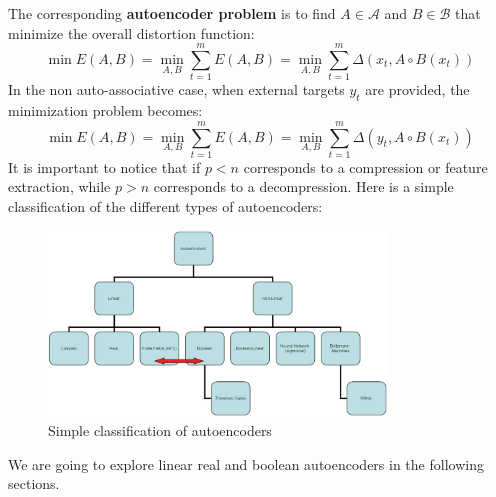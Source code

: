 \documentclass{article}
\begin{document}
 The corresponding \textbf{autoencoder problem} is to find $A \in \mathcal{A}$ and $B \in \mathcal{B}$ that minimize the overall distortion function:
\begin{equation}
    \min E(A,B) = \min_{A ,B} \sum_{t=1}^m E(A,B)=\min_{A ,B} \sum_{t=1}^m \Delta(x_t, A \circ B(x_t))
\end{equation}
In the non auto-associative case, when external targets $y_t$ are provided, the minimization
problem becomes:
\begin{equation}
    \min E(A,B) = \min_{A ,B} \sum_{t=1}^m E(A,B)=\min_{A ,B} \sum_{t=1}^m \Delta(y_t, A \circ B(x_t))
\end{equation}
It is important to notice that if $p < n$ corresponds to a compression or feature extraction, while $p > n$ corresponds to a decompression. Here is a simple classification of the different types of autoencoders:
\begin{figure}[H]
  \centering
  \includegraphics[width=0.8\textwidth]{./Images/Autoencoders_Classification.png}
  \caption{Simple classification of autoencoders}
\end{figure}
We are going to explore linear real and boolean autoencoders in the following sections.






\end{document}
